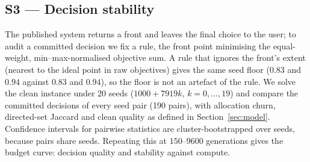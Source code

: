 \documentclass[systems,article,submit,moreauthors,pdftex]{Definitions/mdpi}
\begin{document}
\subsection{S3 --- Decision stability}
The published system returns a front and leaves the final choice to the user; to audit a
committed decision we fix a rule, the front point minimising the equal-weight,
min--max-normalised objective sum. A rule that ignores the front's extent (nearest to the
ideal point in raw objectives) gives the same seed floor ($0.83$ and $0.94$ against $0.83$
and $0.94$), so the floor is not an artefact of the rule. We solve the clean instance under 20 seeds
($1000 + 7919k$, $k = 0,\dots,19$) and compare the committed decisions of every seed pair
(190 pairs), with allocation churn, directed-set Jaccard and clean quality as defined in
Section~\ref{sec:model}. Confidence intervals for pairwise statistics are cluster-bootstrapped
over seeds, because pairs share seeds. Repeating this at $150$--$9600$ generations gives the
budget curve: decision quality and stability against compute.
\end{document}
